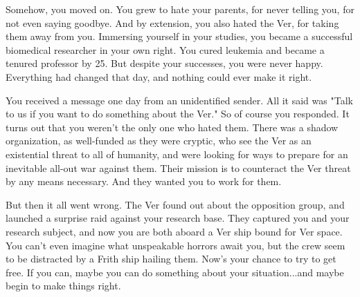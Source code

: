 \documentclass[char]{guildcamp4}
\begin{document}
Somehow, you moved on. You grew to hate your parents, for never telling you, for not even saying goodbye. And by extension, you also hated the Ver, for taking them away from you. Immersing yourself in your studies, you became a successful biomedical researcher in your own right. You cured leukemia and became a tenured professor by 25. But despite your successes, you were never happy. Everything had changed that day, and nothing could ever make it right.

You received a message one day from an unidentified sender. All it said was "Talk to us if you want to do something about the Ver." So of course you responded. It turns out that you weren't the only one who hated them. There was a shadow organization, as well-funded as they were cryptic, who see the Ver as an existential threat to all of humanity, and were looking for ways to prepare for an inevitable all-out war against them. Their mission is to counteract the Ver threat by any means necessary. And they wanted you to work for them.

But then it all went wrong. The Ver found out about the opposition group, and launched a surprise raid against your research base. They captured you and your research subject, and now you are both aboard a Ver ship bound for Ver space. You can't even imagine what unspeakable horrors await you, but the crew seem to be distracted by a Frith ship hailing them. Now's your chance to try to get free. If you can, maybe you can do something about your situation...and maybe begin to make things right.
\end{document}
